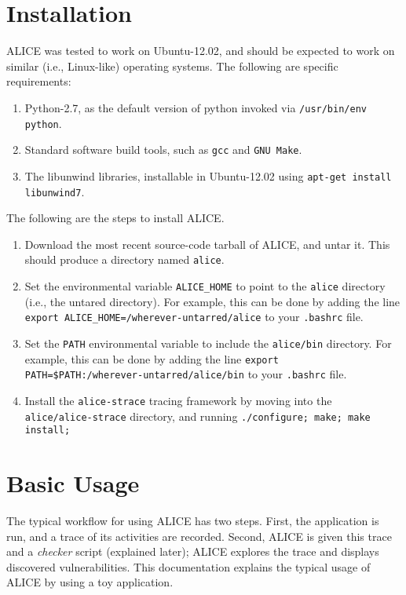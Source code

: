 \documentclass[oneside]{memoir}
\begin{document}
\chapter{Installation}
ALICE was tested to work on Ubuntu-12.02, and should be expected to work on similar (i.e., Linux-like) operating systems. The following are specific requirements:
\begin{enumerate}
\item Python-2.7, as the default version of python invoked via \verb;/usr/bin/env python;.
\item Standard software build tools, such as \verb;gcc; and \verb;GNU Make;.
\item The libunwind libraries, installable in Ubuntu-12.02 using \verb;apt-get install libunwind7;.
\end{enumerate}
The following are the steps to install ALICE.
\begin{enumerate}
\item Download the most recent source-code tarball of ALICE, and untar it. This should produce a directory named \verb;alice;.
\item Set the environmental variable \verb;ALICE_HOME; to point to the \verb;alice; directory (i.e., the untared directory). For example, this can be done by adding the line \verb;export ALICE_HOME=/wherever-untarred/alice; to your \verb;.bashrc; file.
\item Set the \verb;PATH; environmental variable to include the \verb;alice/bin; directory. For example, this can be done by adding the line \verb;export PATH=$PATH:/wherever-untarred/alice/bin; to your \verb;.bashrc; file.
\item Install the \verb;alice-strace; tracing framework by moving into the \verb;alice/alice-strace; directory, and running \verb+./configure; make; make install;+
\end{enumerate}
\chapter{Basic Usage}
The typical workflow for using ALICE has two steps. First, the application is run, and a trace of its activities are recorded. Second, ALICE is given this trace and a \textit{checker} script (explained later); ALICE explores the trace and displays discovered vulnerabilities. This documentation explains the typical usage of ALICE by using a toy application.
\end{document}
